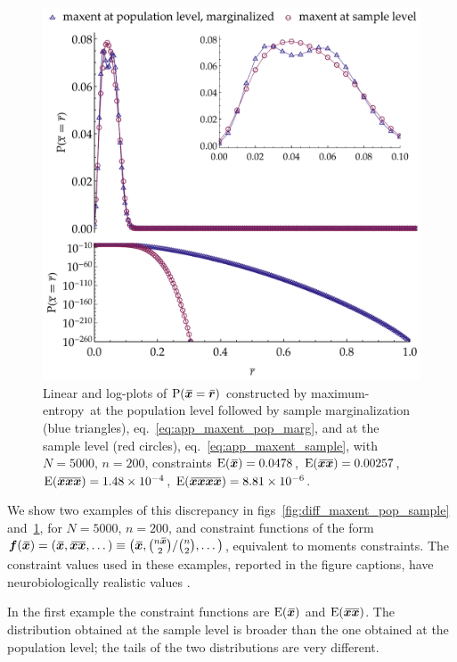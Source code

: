 \documentclass{article}
\theoremstyle{remark}
\theoremstyle{innote}
\newcommand*{\citep}{\parencites}
\renewcommand*{\cite}{\citep}
\renewcommand*{\|}{\mathpunct{|}}%
\newcommand*{\p}{\mathrm{P}}%
\newcommand*{\eqn}{eq.}%
\newcommand*{\figs}{figs}%
\newcommand*{\E}{\mathrm{E}}
\DeclarePairedDelimiter\expp{(}{)}
\newcommand*{\expe}{\E\expp}%
\theoremstyle{simple}
\newcommand*{\widebar}[1]{{\mkern1.5mu\skew{2}\overline{\mkern-1.5mu#1\mkern-1.5mu}\mkern 1.5mu}}
\newcommand*{\sav}{\widebar} %
\newcommand*{\yxx}{x}%
\newcommand*{\yx}{\bm{\yxx}}%
\newcommand*{\yxs}{\sav{\yx}}%
\newcommand*{\yxxs}{\sav{\yx\yx}}%
\newcommand*{\yr}{\bm{r}}%
\newcommand*{\yrs}{\sav{\yr}}%
\newcommand*{\yf}{\bm{f}}
\newcommand*{\me}{maximum-entropy}
\begin{document}
\begin{figure}[!t]
\centering
\includegraphics[width=0.9\linewidth]{different_maxent_pop_sample_200_realdata_4mom.pdf}
% 
\caption{Linear and log-plots of $\p(\yxs = \yrs)$ constructed by \me\ at
  the population level followed by sample marginalization (blue triangles),
  \eqn~\eqref{eq:app_maxent_pop_marg}, and at the sample level (red
  circles), \eqn~\eqref{eq:app_maxent_sample}, with $N=5000$,
  $n=200$, constraints $\expe{\yxs}=0.0478$, $\expe{\yxxs}=0.00257$,
  $\expe{\sav{\yx\yx\yx}}=1.48\times10^{-4}$,
  $\expe{\sav{\yx\yx\yx\yx}}=8.81\times 10^{-6}$.}
\label{fig:diff_maxent_pop_sample_realdata}
\end{figure}%
We show two examples of this discrepancy in
\figs~\ref{fig:diff_maxent_pop_sample}
and~\ref{fig:diff_maxent_pop_sample_realdata}, for $N=5000$, $n=200$, and
constraint functions of the form
$\yf(\yxs)=(\yxs,\yxxs,\dotsc)\equiv\bigl( \yxs,
\raisebox{0pt}[0pt][1ex]{}\binom{n\yxs}{2}/\binom{n}{2},\dotsc \bigr)$,
equivalent to moments constraints. The constraint values used in these
examples, reported in the figure captions, have neurobiologically realistic
values \cite{rostamietal2016_r2017}.

In the first example the constraint functions are $\expe{\yxs}$ and
$\expe{\yxxs}$. The distribution obtained at the sample level is broader
than the one obtained at the population level; the tails of the two
distributions are very different.
\end{document}
